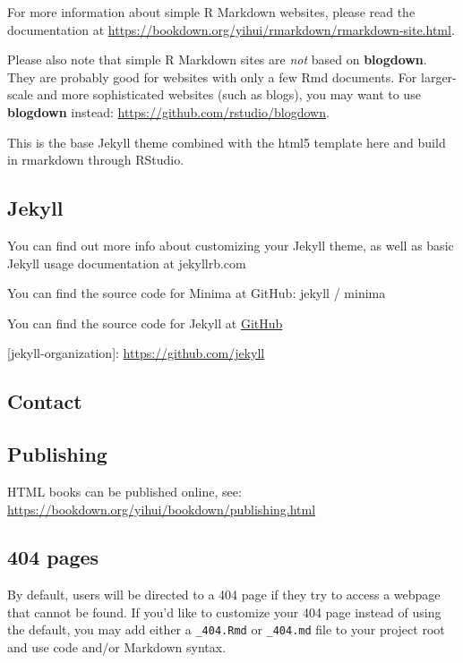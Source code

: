 \documentclass[
]{article}
\theoremstyle{definition}
\theoremstyle{definition}
\theoremstyle{definition}
\theoremstyle{definition}
\theoremstyle{remark}
\begin{document}
For more information about simple R Markdown websites, please read the documentation at \url{https://bookdown.org/yihui/rmarkdown/rmarkdown-site.html}.

Please also note that simple R Markdown sites are \emph{not} based on \textbf{blogdown}. They are probably good for websites with only a few Rmd documents. For larger-scale and more sophisticated websites (such as blogs), you may want to use \textbf{blogdown} instead: \url{https://github.com/rstudio/blogdown}.

This is the base Jekyll theme combined with the html5 template here and build in rmarkdown through RStudio.

\hypertarget{jekyll}{%
\subsection{Jekyll}\label{jekyll}}

You can find out more info about customizing your Jekyll theme, as well as basic Jekyll usage documentation at jekyllrb.com

You can find the source code for Minima at GitHub:
jekyll /
minima

You can find the source code for Jekyll at \href{https://github.com/jekyll/jekyll}{GitHub}

{[}jekyll-organization{]}: \url{https://github.com/jekyll}

\hypertarget{contact}{%
\subsection{Contact}\label{contact}}

\hypertarget{publishing}{%
\subsection{Publishing}\label{publishing}}

HTML books can be published online, see: \url{https://bookdown.org/yihui/bookdown/publishing.html}

\hypertarget{pages}{%
\subsection{404 pages}\label{pages}}

By default, users will be directed to a 404 page if they try to access a webpage that cannot be found. If you'd like to customize your 404 page instead of using the default, you may add either a \texttt{\_404.Rmd} or \texttt{\_404.md} file to your project root and use code and/or Markdown syntax.
\end{document}
